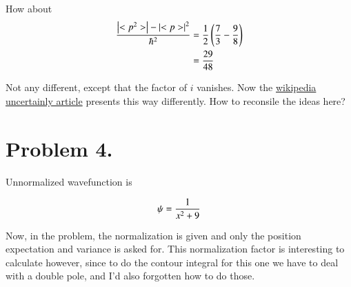 \documentclass{article}
\begin{document}
How about
\begin{align*}
\frac{\left\lvert{<p^2>}\right\rvert  - \left\lvert{<p>}\right\rvert^2 }{\hbar^2}
&= \frac{1}{2}\left(\frac{7}{3} -\frac{9}{8}\right) \\
&= \frac{29}{48}
\end{align*}

Not any different, except that the factor of $i$ vanishes.  Now the 
\href{http://en.wikipedia.org/wiki/Uncertainty_principle#Matrix_mechanics}{wikipedia uncertainly article}
presents this way differently.  How to reconsile the ideas here?

\section{ Problem 4. }

Unnormalized wavefunction is

\begin{align*}
\psi = \frac{1}{x^2 + 9}
\end{align*}

Now, in the problem, the normalization is given and only the position expectation and variance is asked for.  This
normalization factor is interesting to calculate however, since to do the contour integral for this one we have to deal
with a double pole, and I'd also forgotten how to do those.



\end{document}
